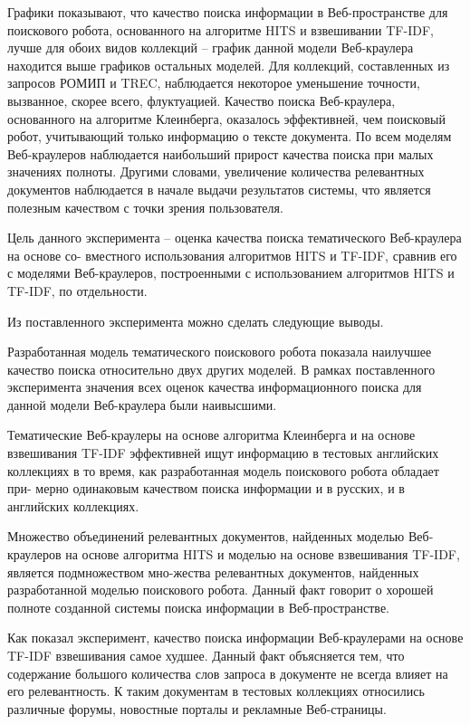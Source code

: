 Графики показывают, что качество поиска информации в Веб-пространстве для поискового робота, основанного на алгоритме HITS и взвешивании TF-IDF, лучше для обоих видов коллекций -- график данной модели Веб-краулера находится выше графиков остальных моделей. Для коллекций, составленных из запросов РОМИП и TREC, наблюдается некоторое уменьшение точности, вызванное, скорее всего, флуктуацией. Качество поиска Веб-краулера, основанного на алгоритме Клеинберга, оказалось эффективней, чем поисковый робот, учитывающий только информацию о тексте документа. По всем моделям Веб-краулеров наблюдается наибольший прирост качества поиска при малых значениях полноты. Другими словами, увеличение количества релевантных документов наблюдается в начале выдачи результатов системы, что является полезным качеством с точки зрения пользователя.

Цель данного эксперимента -- оценка качества поиска тематического Веб-краулера на основе со- вместного использования алгоритмов HITS и TF-IDF, сравнив его с моделями Веб-краулеров, построенными с использованием алгоритмов HITS и TF-IDF, по отдельности.

Из поставленного эксперимента можно сделать следующие выводы.

Разработанная модель тематического поискового робота показала наилучшее качество поиска относительно двух других моделей. В рамках поставленного эксперимента значения всех оценок качества информационного поиска для данной модели Веб-краулера были наивысшими.

Тематические Веб-краулеры на основе алгоритма Клеинберга и на основе взвешивания TF-IDF эффективней ищут информацию в тестовых английских коллекциях в то время, как разработанная модель поискового робота обладает при- мерно одинаковым качеством поиска информации и в русских, и в английских коллекциях.

Множество объединений релевантных документов, найденных моделью Веб-краулеров на основе алгоритма HITS и моделью на основе взвешивания TF-IDF, является подмножеством мно-жества релевантных документов, найденных разработанной моделью поискового робота. Данный факт говорит о хорошей полноте созданной системы поиска информации в Веб-пространстве.

Как показал эксперимент, качество поиска информации Веб-краулерами на основе TF-IDF взвешивания самое худшее. Данный факт объясняется тем, что содержание большого количества слов запроса в документе не всегда влияет на его релевантность. К таким документам в тестовых коллекциях относились различные форумы, новостные порталы и рекламные Веб-страницы.

